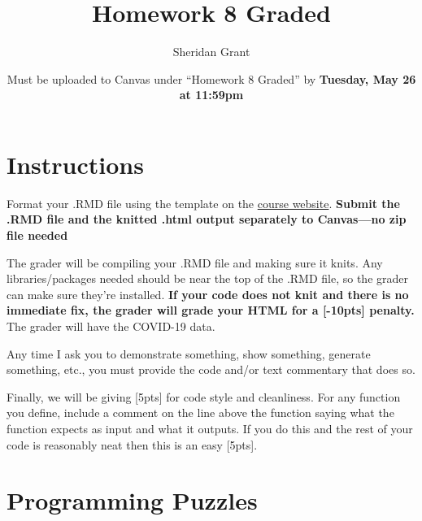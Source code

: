 \documentclass[12pt]{article}
\title{Homework 8 Graded}
\author{Sheridan Grant}
\date{Must be uploaded to Canvas under ``Homework 8 Graded'' by \textbf{Tuesday, May 26 at 11:59pm}}
\begin{document}
\sloppy

\maketitle

\section*{Instructions}

Format your .RMD file using the template on the \href{https://sheridanlgrant.github.io/teaching/STAT302_SPR2020}{course website}. \textbf{Submit the .RMD file and the knitted .html output separately to Canvas---no zip file needed}

The grader will be compiling your .RMD file and making sure it knits. Any libraries/packages needed should be near the top of the .RMD file, so the grader can make sure they're installed. \textbf{If your code does not knit and there is no immediate fix, the grader will grade your HTML for a [-10pts] penalty.} The grader will have the COVID-19 data.

Any time I ask you to demonstrate something, show something, generate something, etc., you must provide the code and/or text commentary that does so.

Finally, we will be giving [5pts] for code style and cleanliness. For any function you define, include a comment on the line above the function saying what the function expects as input and what it outputs. If you do this and the rest of your code is reasonably neat then this is an easy [5pts].

\section{Programming Puzzles}
\end{document}
